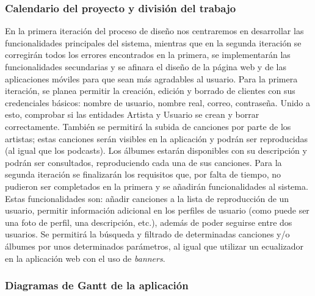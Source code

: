 \documentclass{article}
\begin{document}
\newpage

\subsubsection{Calendario del proyecto y división del trabajo}
En la primera iteración del proceso de diseño nos centraremos en desarrollar las funcionalidades principales del sistema, mientras que en la segunda iteración se corregirán todos los errores encontrados en la primera, se implementarán las funcionalidades secundarias y se afinara el diseño de la página web y de las aplicaciones móviles para que sean más agradables al usuario. 
\hfill \break
Para la primera iteración, se planea permitir la creación, edición y borrado de clientes con sus credenciales básicos: nombre de usuario, nombre real, correo, contraseña. Unido a esto, comprobar si las entidades Artista y Usuario se crean y borrar correctamente.  También se permitirá la subida de canciones por parte de los artistas; estas canciones serán visibles en la aplicación y podrán ser reproducidas (al igual que los podcasts). Los álbumes estarán disponibles con su descripción y podrán ser consultados, reproduciendo cada una de sus canciones.
\hfill \break
Para la segunda iteración se finalizarán los requisitos que, por falta de tiempo, no pudieron ser completados en la primera y se añadirán funcionalidades al sistema. Estas funcionalidades son: añadir canciones a la lista de reproducción de un usuario, permitir información adicional en los perfiles de usuario (como puede ser una foto de perfil, una descripción, etc.), además de poder seguirse entre dos usuarios. Se permitirá la búsqueda y filtrado de determinadas canciones y/o álbumes por unos determinados parámetros, al igual que utilizar un ecualizador en la aplicación web con el uso de \textit{banners}.


\newpage

\subsubsection{Diagramas de Gantt de la aplicación}
\begin{figure}[H]
	\hspace*{-3.7cm}
\end{figure}
\begin{figure}[H]
	\hspace*{-3.7cm}
\end{figure}
\begin{figure}[H]
	\hspace*{-3.7cm}
\end{figure}
\end{document}
